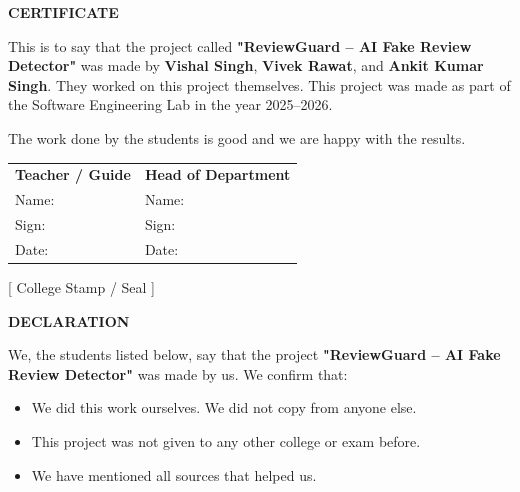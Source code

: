 \documentclass[10pt, a4paper]{report}
\begin{document}
\newpage
\thispagestyle{empty}
\begin{center}
  {\Large\bfseries\color{myblue} CERTIFICATE}
\end{center}
\vspace{1cm}

This is to say that the project called \textbf{"ReviewGuard -- AI Fake Review Detector"} was made by \textbf{Vishal Singh}, \textbf{Vivek Rawat}, and \textbf{Ankit Kumar Singh}. They worked on this project themselves. This project was made as part of the Software Engineering Lab in the year 2025--2026.

The work done by the students is good and we are happy with the results.

\vspace{3cm}

\begin{tabular}{p{}p{}}
  \textbf{Teacher / Guide} & \textbf{Head of Department} \\[1.5cm]
  Name: \hrulefill & Name: \hrulefill \\[0.5cm]
  Sign: \hrulefill & Sign: \hrulefill \\[0.5cm]
  Date: \hrulefill & Date: \hrulefill \\
\end{tabular}

\vspace{2cm}
\begin{center}
  {[ College Stamp / Seal ]}
\end{center}

\newpage
\thispagestyle{empty}
\begin{center}
  {\Large\bfseries\color{myblue} DECLARATION}
\end{center}
\vspace{0.8cm}

We, the students listed below, say that the project \textbf{"ReviewGuard -- AI Fake Review Detector"} was made by us. We confirm that:

\begin{itemize}
  \item We did this work ourselves. We did not copy from anyone else.
  \item This project was not given to any other college or exam before.
  \item We have mentioned all sources that helped us.
\end{itemize}
\end{document}
